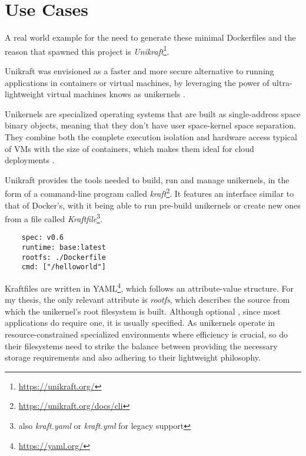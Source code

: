 \chapter{Use Cases}
\label{chapter:use-cases}

A real world example for the need to generate these minimal Dockerfiles and
the reason that spawned this project is \textit{Unikraft}\footnote[1]{\url{https://unikraft.org/}}.

Unikraft was envisioned as a faster and more secure alternative to running applications in containers or virtual machines, by
leveraging the power of ultra-lightweight virtual machines knows as unikernels \cite{unikraft}.


Unikernels are specialized operating systems that are built as single-address space binary objects, meaning that they don't 
have user space-kernel space separation. They combine both the complete execution isolation and hardware access typical of VMs with the size of containers,
which makes them ideal for cloud deployments  \cite{unikraft}.

Unikraft provides the tools needed to build, run and manage unikernels, in the form of a command-line program called \textit{kraft}\footnote{\url{https://unikraft.org/docs/cli}}.
It features an interface similar to that of Docker's, with it being able to run pre-build unikernels or create new ones from a file called \textit{Kraftfile}\footnote{also \textit{kraft.yaml} or \textit{kraft.yml} for legacy support}.

\lstset{language=yaml,caption=Sample Kraftfile,label=lst:ex-kraftfile}
\begin{lstlisting}
    spec: v0.6
    runtime: base:latest
    rootfs: ./Dockerfile
    cmd: ["/helloworld"]  
\end{lstlisting}

Kraftfiles are written in YAML\footnote{\url{https://yaml.org/}}, which follows an attribute-value structure. For my thesis, the only relevant attribute is \textit{rootfs}, which
describes the source from which the unikernel's root filesystem is built. Although optional \cite{unikraft-filesystem}, since most applications do require one, it is usually specified.
As unikernels operate in resource-constrained specialized environments where efficiency is crucial, so do their filesystems need to strike the balance between
providing the necessary storage requirements and also adhering to their lightweight philosophy.

